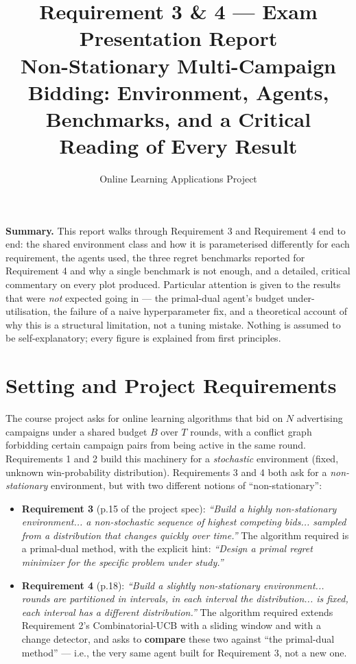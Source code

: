 \documentclass[11pt,a4paper]{article}
\title{\textbf{Requirement 3 \& 4 --- Exam Presentation Report}\\[-0.3em]
\large Non-Stationary Multi-Campaign Bidding: Environment, Agents, Benchmarks, and a Critical Reading of Every Result}
\author{Online Learning Applications Project}
\date{}
\newcommand{\1}{\mathbf{1}}
\begin{document}
\maketitle
\vspace{-1.2em}

\begin{center}
\colorbox{softblue}{\parbox{0.94\linewidth}{
\textbf{Summary.} This report walks through Requirement 3 and Requirement 4 end to end: the shared environment class and how it is parameterised differently for each requirement, the agents used, the three regret benchmarks reported for Requirement 4 and why a single benchmark is not enough, and a detailed, critical commentary on every plot produced. Particular attention is given to the results that were \emph{not} expected going in --- the primal-dual agent's budget under-utilisation, the failure of a naive hyperparameter fix, and a theoretical account of why this is a structural limitation, not a tuning mistake. Nothing is assumed to be self-explanatory; every figure is explained from first principles.
}}
\end{center}

\tableofcontents
\newpage

\section{Setting and Project Requirements}

The course project asks for online learning algorithms that bid on $N$ advertising campaigns under a shared budget $B$ over $T$ rounds, with a conflict graph forbidding certain campaign pairs from being active in the same round. Requirements 1 and 2 build this machinery for a \emph{stochastic} environment (fixed, unknown win-probability distribution). Requirements 3 and 4 both ask for a \emph{non-stationary} environment, but with two different notions of ``non-stationary'':

\begin{itemize}[leftmargin=1.4em]
  \item \textbf{Requirement 3} (p.15 of the project spec): \emph{``Build a highly non-stationary environment... a non-stochastic sequence of highest competing bids... sampled from a distribution that changes quickly over time.''} The algorithm required is a primal-dual method, with the explicit hint: \emph{``Design a primal regret minimizer for the specific problem under study.''}
  \item \textbf{Requirement 4} (p.18): \emph{``Build a slightly non-stationary environment... rounds are partitioned in intervals, in each interval the distribution... is fixed, each interval has a different distribution.''} The algorithm required extends Requirement 2's Combinatorial-UCB with a sliding window and with a change detector, and asks to \textbf{compare} these two against ``the primal-dual method'' --- i.e., the very same agent built for Requirement 3, not a new one.
\end{itemize}
\end{document}
